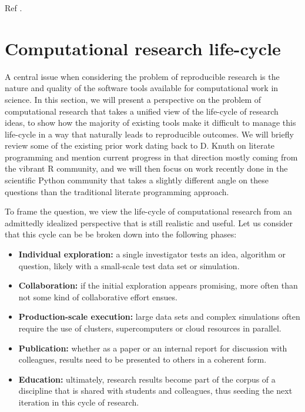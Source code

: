 \documentclass[ChapterTOCs,krantz2]{krantz} %
\begin{document}
Ref \cite{10.3389/fncom.2012.00018}.

\section{\label{sec:life-cycle}Computational research life-cycle}

A central issue when considering the problem of reproducible research is the
nature and quality of the software tools available for computational work in
science.  In this section, we will present a perspective on the problem of
computational research that takes a unified view of the life-cycle of research
ideas, to show how the majority of existing tools make it difficult to manage
this life-cycle in a way that naturally leads to reproducible outcomes.  We will
briefly review some of the existing prior work dating back to D. Knuth on
literate programming and mention current progress in that direction mostly
coming from the vibrant R community, and we will then focus on work recently
done in the scientific Python community that takes a slightly different angle
on these questions than the traditional literate programming approach.

To frame the question, we view the life-cycle of computational research from an
admittedly idealized perspective that is still realistic and useful. Let us
consider that this cycle can be be broken down into the following phases:

\begin{itemize}
\item \textbf{Individual exploration:} a single investigator tests an idea,
  algorithm or question, likely with a small-scale test data set or simulation.
\item \textbf{Collaboration:} if the initial exploration appears promising,
  more often than not some kind of collaborative effort ensues.
\item \textbf{Production-scale execution:} large data sets and complex
  simulations often require the use of clusters, supercomputers or cloud
  resources in parallel.
\item \textbf{Publication:} whether as a paper or an internal report for
  discussion with colleagues, results need to be presented to others in a
  coherent form.
\item \textbf{Education:} ultimately, research results become part of the
  corpus of a discipline that is shared with students and colleagues, thus
  seeding the next iteration in this cycle of research.
\end{itemize}
\end{document}
